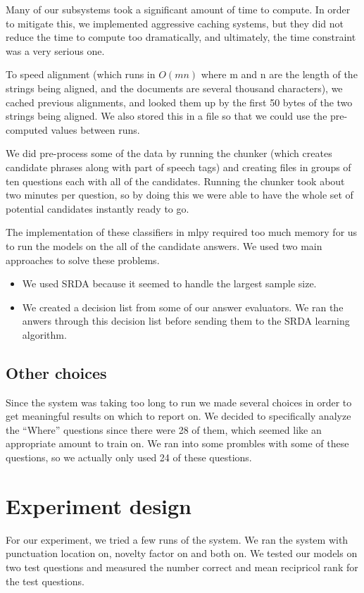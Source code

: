 \documentclass{article}
\begin{document}
Many of our subsystems took a significant amount of time to compute.  In order
to mitigate this, we implemented aggressive caching systems, but they did not
reduce the time to compute too dramatically, and ultimately, the time constraint
was a very serious one.

To speed alignment (which runs in $O(mn)$ where m and n are the length of the strings being aligned, and the documents are several thousand characters), we cached previous alignments, and looked them up by the first 50 bytes of the two strings being aligned.  We also stored this in a file so that we could use the pre-computed values between runs.

We did pre-process some of the data by running the chunker (which creates
candidate phrases along with part of speech tags) and creating files in
groups of ten questions each with all of the candidates. Running the chunker
took about two minutes per question, so by doing this we were able to have
the whole set of potential candidates instantly ready to go.

The implementation of these classifiers in mlpy required too much memory for
us to run the models on the all of the candidate answers. We used two main approaches
to solve these problems.
\begin{itemize}
\item We used SRDA because it seemed to handle the largest sample size.
\item We created a decision list from some of our answer evaluators. We ran the anwers
through this decision list before sending them to the SRDA learning algorithm.
\end{itemize}

\subsection{Other choices}
Since the system was taking too long to run we made several choices in order
to get meaningful results on which to report on. We decided to specifically analyze
the ``Where'' questions since there were 28 of them, which seemed like an appropriate
amount to train on. We ran into some prombles with some of these questions, so we
actually only used 24 of these questions. 

\section{Experiment design}
For our experiment, we tried a few runs of the system. We ran the system with
punctuation location on, novelty factor on and both on.
We tested our models on two test questions and measured the number correct and
mean recipricol rank for the test questions.
\end{document}
